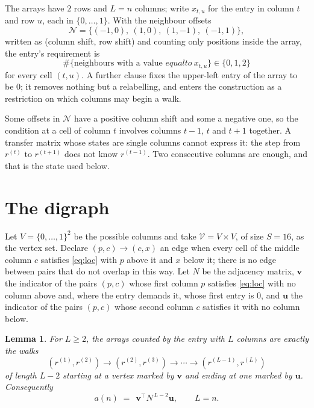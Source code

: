 \documentclass[11pt,a4paper]{article}
\theoremstyle{plain}
\newtheorem{lemma}[theorem]{Lemma}
\theoremstyle{definition}
\begin{document}
The arrays have $2$ rows and $L=n$ columns; write $x_{t,u}$ for the entry in
column $t$ and row $u$, each in $\{0,\dots,1\}$. With the neighbour offsets
\[
\mathcal N=\{(-1,0),\ (1,0),\ (1,-1),\ (-1,1)\},
\]
written as (column shift, row shift) and counting only positions inside the array, the
entry's requirement is
\begin{equation}\label{eq:loc}
\#\{\text{neighbours with a value }equal to\ x_{t,u}\}\in\{0,1,2\}
\end{equation}
for every cell $(t,u)$. A further clause fixes the upper-left entry of the array to be $0$; it removes nothing but a relabelling, and enters the construction as a restriction on which columns may begin a walk.

Some offsets in $\mathcal N$ have a positive column shift and some a negative one, so the
condition at a cell of column $t$ involves columns $t-1$, $t$ and $t+1$ together. A transfer
matrix whose states are single columns cannot express it: the step from $r^{(t)}$ to
$r^{(t+1)}$ does not know $r^{(t-1)}$. Two consecutive columns are enough, and that is
the state used below.

\section{The digraph}

Let $V=\{0,\dots,1\}^{2}$ be the possible columns and take
$\mathcal V=V\times V$, of size $S=16$, as the vertex set. Declare $(p,c)\to(c,x)$ an edge
when every cell of the middle column $c$ satisfies \eqref{eq:loc} with $p$ above it and $x$
below it; there is no edge between pairs that do not overlap in this way. Let $N$ be the
adjacency matrix, $\mathbf{v}$ the indicator of the pairs $(p,c)$ whose first column $p$
satisfies \eqref{eq:loc} with no column above and, where the entry demands it, whose first entry is $0$, and $\mathbf{u}$ the indicator of
the pairs $(p,c)$ whose second column $c$ satisfies it with no column below.

\begin{lemma}\label{lem:walk}
For $L\ge2$, the arrays counted by the entry with $L$ columns are exactly the walks
\[
(r^{(1)},r^{(2)})\to(r^{(2)},r^{(3)})\to\cdots\to(r^{(L-1)},r^{(L)})
\]
of length $L-2$ starting at a vertex marked by $\mathbf{v}$ and ending at one marked by
$\mathbf{u}$. Consequently
\[
a(n)\;=\;\,\mathbf{v}^{\!\top}N^{\,L-2}\mathbf{u},\qquad L=n .
\]
\end{lemma}
\end{document}
